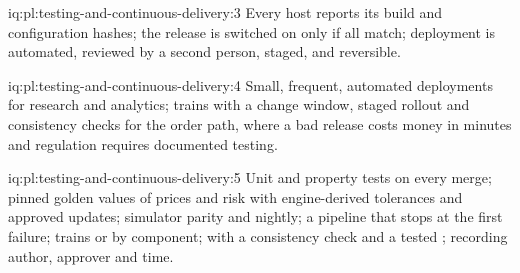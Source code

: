 \begin{solution}{iq:pl:testing-and-continuous-delivery:3}
Every host reports its build and configuration hashes; the release is switched on only if all match; deployment is automated, reviewed
by a second person, staged, and reversible.
\end{solution}

\begin{solution}{iq:pl:testing-and-continuous-delivery:4}
Small, frequent, automated deployments for research and analytics; trains with a change window, staged rollout and consistency checks for the
order path, where a bad release costs money in minutes and regulation requires documented testing.
\end{solution}

\begin{solution}{iq:pl:testing-and-continuous-delivery:5}
Unit and property tests on every merge; pinned golden values of prices and risk with engine-derived tolerances and approved updates;
simulator parity and  nightly; a pipeline that stops at the first failure; trains or  by component;
 with a consistency check and a tested ;  recording author, approver and time.
\end{solution}
